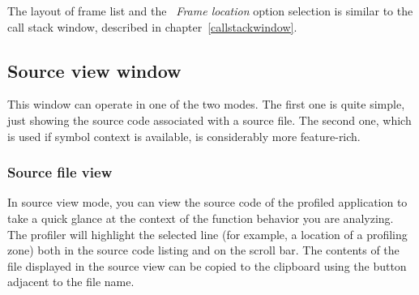 \documentclass[hidelinks,titlepage,a4paper,twoside]{article}
\begin{document}
The layout of frame list and the \emph{\faAt{}~Frame location} option selection is similar to the call stack window, described in chapter~\ref{callstackwindow}.

\subsection{Source view window}
\label{sourceview}

This window can operate in one of the two modes. The first one is quite simple, just showing the source code associated with a source file. The second one, which is used if symbol context is available, is considerably more feature-rich.

\subsubsection{Source file view}

In source view mode, you can view the source code of the profiled application to take a quick glance at the context of the function behavior you are analyzing. The profiler will highlight the selected line (for example, a location of a profiling zone) both in the source code listing and on the scroll bar. The contents of the file displayed in the source view can be copied to the clipboard using the button adjacent to the file name.
\end{document}
